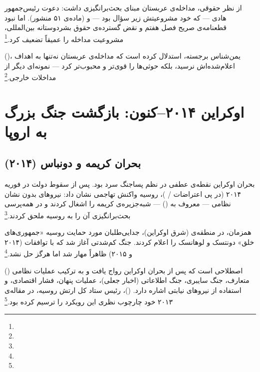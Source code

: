 از نظر حقوقی، مداخله‌ی عربستان مبنای بحث‌برانگیزی داشت: دعوت رئیس‌جمهور هادی — که خود مشروعیتش زیر سؤال بود — و  (ماده‌ی ۵۱ منشور). اما نبود قطعنامه‌ی صریح فصل هفتم و نقض گسترده‌ی حقوق بشردوستانه بین‌المللی، مشروعیت مداخله را عمیقاً تضعیف کرد.\footnote{}

 ()، یمن‌شناس برجسته، استدلال کرده است که مداخله‌ی عربستان نه‌تنها به اهداف اعلام‌شده‌اش نرسید، بلکه حوثی‌ها را قوی‌تر و محبوب‌تر کرد — نمونه‌ای دیگر از  مداخلات خارجی.\footnote{}


\section{اوکراین ۲۰۱۴–کنون: بازگشت جنگ بزرگ به اروپا}
\label{sec:ch10-ukraine}

\subsection{بحران کریمه و دونباس (۲۰۱۴)}
\label{subsec:ch10-ukraine-crimea}

بحران اوکراین نقطه‌ی عطفی در نظم پساجنگ سرد بود. پس از سقوط دولت  در فوریه ۲۰۱۴ (در پی اعتراضات  / )، روسیه واکنش تهاجمی نشان داد: نیروهای بدون نشان نظامی — معروف به  () — شبه‌جزیره‌ی کریمه را اشغال کردند و در همه‌پرسی بحث‌برانگیزی آن را به روسیه ملحق کردند.\footnote{}

همزمان، در منطقه‌ی  (شرق اوکراین)، جدایی‌طلبان مورد حمایت روسیه «جمهوری‌های خلق» دونتسک و لوهانسک را اعلام کردند. جنگ کم‌شدتی آغاز شد که با توافقات  (۲۰۱۴ و ۲۰۱۵) ظاهراً مهار شد اما هرگز حل نشد.\footnote{}

\begin{tcolorbox}[defbox, title={مفهوم کلیدی: جنگ ترکیبی}]
 () اصطلاحی است که پس از بحران اوکراین رواج یافت و به ترکیب عملیات نظامی متعارف، جنگ سایبری، جنگ اطلاعاتی (اخبار جعلی)، عملیات پنهان، فشار اقتصادی، و استفاده از نیروهای نیابتی اشاره دارد.  ()، رئیس ستاد کل ارتش روسیه، در مقاله‌ی ۲۰۱۳ خود چارچوب نظری این رویکرد را ترسیم کرده بود.\footnote{}
\end{tcolorbox}


